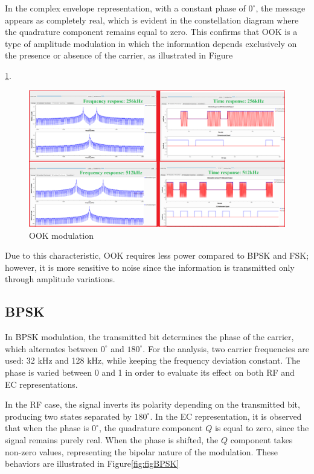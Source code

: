 \documentclass{journal}[IEEEtran, twocolumn]             %
\begin{document}
\begin{multicols}{2}
In the complex envelope representation, with a constant phase of $0^\circ$, the message 
appears as completely real, which is evident in the constellation diagram where the 
quadrature component remains equal to zero. This confirms that OOK is a type of 
amplitude modulation in which the information depends exclusively on the presence 
or absence of the carrier, as illustrated in Figure



\ref{fig:figOOK}.

\begin{figure}[H]
    \centering
        \centering
        \includegraphics[width=0.7\columnwidth]{figs/OOK.png}
    \caption{OOK modulation}
    \label{fig:figOOK}
\end{figure}
Due to this characteristic, OOK requires less power compared to BPSK and FSK; 
however, it is more sensitive to noise since the information is transmitted only 
through amplitude variations.

\subsection{BPSK}
In BPSK modulation, the transmitted bit determines the phase of the carrier, 
which alternates between $0^\circ$ and $180^\circ$. For the analysis, two carrier 
frequencies are used: 32 kHz and 128 kHz, while keeping the frequency deviation constant. 
The phase is varied between 0 and 1 in order to evaluate its effect on both RF and EC 
representations.

In the RF case, the signal inverts its polarity depending on the transmitted bit, 
producing two states separated by $180^\circ$. In the EC representation, it is observed 
that when the phase is $0^\circ$, the quadrature component $Q$ is equal to zero, since 
the signal remains purely real. When the phase is shifted, the $Q$ component takes 
non-zero values, representing the bipolar nature of the modulation. These behaviors 
are illustrated in Figure\ref{fig:figBPSK}  



\end{multicols}
\end{document}
